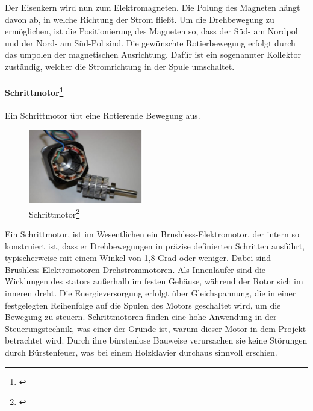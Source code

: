 Der Eisenkern wird nun zum Elektromagneten. Die Polung des Magneten hängt davon ab, in welche Richtung der Strom fließt.
Um die Drehbewegung zu ermöglichen, ist die Positionierung des Magneten so, dass der Süd- am Nordpol und der Nord- am Süd-Pol
sind. Die gewünschte Rotierbewegung erfolgt durch das umpolen der magnetischen Ausrichtung.
Dafür ist ein sogenannter Kollektor zuständig, welcher die Stromrichtung in der Spule umschaltet.


\paragraph{Schrittmotor\footnote{\cite*[siehe ][]{Aufbau.Elektromotoren}}}
Ein Schrittmotor übt eine Rotierende Bewegung aus.
\begin{figure}[htbp]
	\centering
	\includegraphics[width=5cm]{img/Schrittmotor}
	\caption{Schrittmotor\footnote{\cite*[siehe ][]{Aufbau.Elektromotoren}}}
	\label{fig:Linearmotor}
\end{figure}
Ein Schrittmotor, ist im Wesentlichen ein Brushless-Elektromotor, der intern so konstruiert ist,
dass er Drehbewegungen in präzise definierten Schritten ausführt, typischerweise mit einem Winkel von 1,8 Grad oder weniger.
Dabei sind Brushless-Elektromotoren Drehstrommotoren. Als Innenläufer sind die Wicklungen des stators außerhalb im festen Gehäuse,
während der Rotor sich im inneren dreht.
Die Energieversorgung erfolgt über Gleichspannung, die in einer festgelegten Reihenfolge auf die Spulen des Motors
geschaltet wird, um die Bewegung zu steuern.
Schrittmotoren finden eine hohe Anwendung in der Steuerungstechnik, was einer der Gründe ist, warum dieser Motor in dem
Projekt betrachtet wird. Durch ihre bürstenlose Bauweise verursachen sie keine Störungen durch Bürstenfeuer, was bei einem
Holzklavier durchaus sinnvoll erschien.


